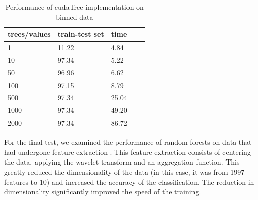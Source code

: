\documentclass[thesis=B,english]{FITthesis}[2012/10/20]
\begin{document}
\begin{table}[h]
\begin{tabular}{|l|l|l|l|l|}
\hline
trees/values & train-test set & time \\ \hline
1&11.22&4.84\\ \hline
10&97.34&5.22\\ \hline
50&96.96&6.62\\ \hline
100&97.15&8.79\\ \hline
500&97.34&25.04\\ \hline
1000&97.34&49.20\\ \hline
2000&97.34&86.72\\ \hline

\end{tabular}
\caption{Performance of cudaTree implementation on binned data}
\label{tab:cuda-binned}
\end{table}

For the final test, we examined the performance of random forests on data that had undergone feature extraction \cite{bromovabeclass}. This feature extraction consists of centering the data, applying the wavelet transform and an aggregation function. This greatly reduced the dimensionality of the data (in this case, it was from 1997 features to 10) and increased the accuracy of the classification. The reduction in dimensionality significantly improved the speed of the training.
\end{document}
